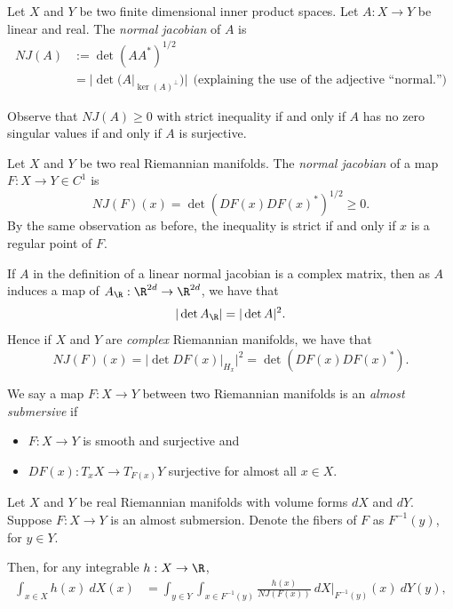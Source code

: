 \documentclass[10pt]{amsart}
\numberwithin{equation}{section}     %
\begin{document}
\begin{definition}
    
Let $X$ and $Y$ be two finite dimensional inner product spaces. Let $A:X \to Y$ be linear and real. The \textit{normal jacobian} of $A$ is \begin{align*}
    NJ(A) & := \det (AA^*)^{1/2} \\ 
    & = |\det(A|_{\ker(A)^\perp})|\ \ \text{(explaining the use of the adjective ``normal.'')}
\end{align*}

Observe that $NJ(A) \geq 0$ with strict inequality if and only if $A$ has no zero singular values if and only if $A$ is surjective.
\end{definition}

\begin{definition} \label{nonlinearNJ}
    
Let $X$ and $Y$ be two real Riemannian manifolds. The \textit{normal jacobian} of a map $F:X \to Y \in C^1$ is $$NJ(F)(x) = \det(DF(x) DF(x)^*)^{1/2} \geq 0.$$  By the same observation as before, the inequality is strict if and only if $x$ is a regular point of $F$. 
\end{definition}

\begin{remark}
\label{remarkable}
If $A$ in the definition of a linear normal jacobian is a complex matrix, then as $A$ induces a map of $A_\R : \R^{2d} \to \R^{2d}$, we have that $$|\det A_\R| = |\det A|^2.$$ Hence if $X$ and $Y$ are \emph{complex} Riemannian manifolds, we have that $$NJ(F)(x) = |\det DF(x)|_{H_x}|^2 = \det(DF(x)DF(x)^*). $$
\end{remark}

\begin{definition} \label{almost_submersions}
    We say a map $F:X \to Y$ between two Riemannian manifolds is an \emph{almost submersive} if \begin{itemize}
        \item $F:X \to Y$ is smooth and surjective and 
        \item $DF(x):T_x X \to T_{F(x)}Y$ surjective for almost all $x \in X$. 
    \end{itemize}
\end{definition}

\begin{theorem}
    \label{coarea}
    Let $X$ and $Y$ be real Riemannian manifolds with volume forms $dX$ and $dY$. Suppose $F:X \to Y$ is an almost submersion. Denote the fibers of $F$ as $F^{-1}(y)$, for $y \in Y$. 
    
    Then, for any integrable $h:X \to \R$, 
    \begin{align*}
        \int_{x \in X} h(x) \ dX(x) &= \int_{y \in Y} \int_{x \in F^{-1}(y)} \frac{h(x)}{NJ(F(x))} \ dX|_{F^{-1}(y)}(x) \ dY(y), 
    \end{align*}
\end{theorem}
\end{document}

